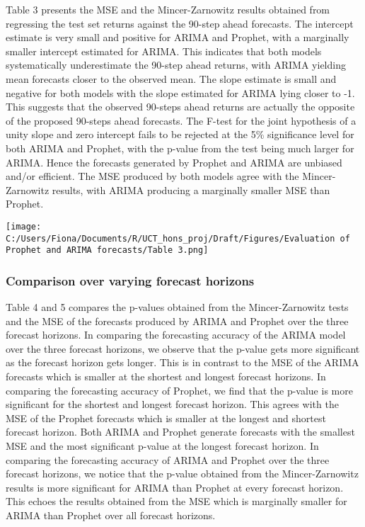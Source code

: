 \documentclass[12pt,a4paper]{article}
\numberwithin{equation}{section}
\numberwithin{figure}{section}
\numberwithin{table}{section}
\let\origfigure\figure
\let\endorigfigure\endfigure
\renewenvironment{figure}[1][2] {
    \expandafter\origfigure\expandafter[H]
} {
    \endorigfigure
}
\begin{document}
Table 3 presents the MSE and the Mincer-Zarnowitz results obtained from
regressing the test set returns against the 90-step ahead forecasts. The
intercept estimate is very small and positive for ARIMA and Prophet,
with a marginally smaller intercept estimated for ARIMA. This indicates
that both models systematically underestimate the 90-step ahead returns,
with ARIMA yielding mean forecasts closer to the observed mean. The
slope estimate is small and negative for both models with the slope
estimated for ARIMA lying closer to -1. This suggests that the observed
90-steps ahead returns are actually the opposite of the proposed
90-steps ahead forecasts. The F-test for the joint hypothesis of a unity
slope and zero intercept fails to be rejected at the 5\% significance
level for both ARIMA and Prophet, with the p-value from the test being
much larger for ARIMA. Hence the forecasts generated by Prophet and
ARIMA are unbiased and/or efficient. The MSE produced by both models
agree with the Mincer-Zarnowitz results, with ARIMA producing a
marginally smaller MSE than Prophet.

\begin{figure}[htbp]
\centering
\texttt{[image: C:/Users/Fiona/Documents/R/UCT\_hons\_proj/Draft/Figures/Evaluation of Prophet and ARIMA forecasts/Table 3.png]}
\caption{Mincer-Zarnowitz results for 90-step ahead forecasts}
\end{figure}

\subsubsection{Comparison over varying forecast
horizons}\label{comparison-over-varying-forecast-horizons}

Table 4 and 5 compares the p-values obtained from the Mincer-Zarnowitz
tests and the MSE of the forecasts produced by ARIMA and Prophet over
the three forecast horizons. In comparing the forecasting accuracy of
the ARIMA model over the three forecast horizons, we observe that the
p-value gets more significant as the forecast horizon gets longer. This
is in contrast to the MSE of the ARIMA forecasts which is smaller at the
shortest and longest forecast horizons. In comparing the forecasting
accuracy of Prophet, we find that the p-value is more significant for
the shortest and longest forecast horizon. This agrees with the MSE of
the Prophet forecasts which is smaller at the longest and shortest
forecast horizon. Both ARIMA and Prophet generate forecasts with the
smallest MSE and the most significant p-value at the longest forecast
horizon. In comparing the forecasting accuracy of ARIMA and Prophet over
the three forecast horizons, we notice that the p-value obtained from
the Mincer-Zarnowitz results is more significant for ARIMA than Prophet
at every forecast horizon. This echoes the results obtained from the MSE
which is marginally smaller for ARIMA than Prophet over all forecast
horizons.
\end{document}
